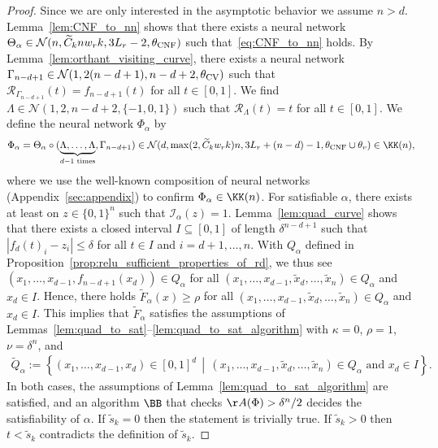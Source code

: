 \documentclass{amsart}[11pt]
\numberwithin{equation}{section}
\newcommand{\nn}{\mathcal{N}}
\newcommand{\realization}{\mathcal{R}}
\newcommand{\interpretation}{\mathcal{I}}
\numberwithin{theorem}{section}
\begin{document}
\begin{proof}
    Since we are only interested in the asymptotic behavior we assume $n > d$. Lemma~\ref{lem:CNF_to_nn} shows that there exists a neural network $\Theta_\alpha \in \nn(n, \widetilde C_k n w_r k, 3L_r - 2, \theta_{\rm{CNF}})$ such that~\eqref{eq:CNF_to_nn} holds. By Lemma~\ref{lem:orthant_visiting_curve}, there exists a neural network $\Gamma_{n - d + 1} \in \nn(1, 2(n - d + 1), n - d + 2, \theta_{\rm CV})$ such that $\realization_{\Gamma_{n - d + 1}}(t) = f_{n - d + 1}(t)$ for all $t \in [0, 1]$. We find $\Lambda \in \nn(1, 2, n - d + 2, \{-1, 0, 1\})$ such that $\realization_{\Lambda}(t) = t$ for all $t \in [0, 1]$. We define the neural network $\Phi_\alpha$ by
    \begin{align*}
        \Phi_\alpha = \Theta_\alpha \circ (\underbrace{\Lambda, \ldots, \Lambda}_{d-1 \text{ times}}, \Gamma_{n - d + 1}) \in \nn(d, \max(2, \widetilde C_k w_r k)n, 3L_r + (n - d) - 1, \theta_{\rm{CNF}} \cup \theta_{v}) \in \KK(n),
    \end{align*}
    where we use the well-known composition of neural networks (Appendix~\ref{sec:appendix}) to confirm $\Phi_\alpha \in \KK(n)$. 
    For satisfiable $\alpha$, there exists at least on $z\in \{0,1\}^n$ such that $\interpretation_\alpha(z)=1$.
    Lemma~\ref{lem:quad_curve} shows that there exists a closed interval $I \subseteq [0, 1]$ of length $\delta^{n-d+1}$ such that $|f_d(t)_i- z_i| \leq \delta$ for all $t \in I$ and $i= d +1,\ldots,n$. 
    With $Q_\alpha$ defined in Proposition~\ref{prop:relu_sufficient_properties_of_rd}, we thus see $(x_1,\ldots,x_{d-1},f_{n-d+1}(x_d))\in Q_\alpha$ for all $(x_1,\ldots,x_{d-1}, \widetilde x_d, \ldots, \widetilde x_n)\in Q_\alpha$ and $x_d\in I$.
    Hence, there holds $\widetilde F_\alpha(x)\geq \rho$ for all $(x_1,\ldots,x_{d-1}, \widetilde x_d, \ldots, \widetilde x_n)\in Q_\alpha$ and $x_d\in I$.
    This implies that $\widetilde F_\alpha$ satisfies the assumptions of Lemmas~\ref{lem:quad_to_sat}--\ref{lem:quad_to_sat_algorithm} with $\kappa=0$, $\rho=1$, $\nu = \delta^n$, and
    \begin{align*}
        \widetilde{Q}_\alpha := \left\{(x_1,\ldots,x_{d-1},x_d) \in [0, 1]^d \, \middle| \, (x_1,\ldots,x_{d-1},\widetilde x_d, \ldots, \widetilde x_n) \in Q_\alpha\text{ and } x_d\in I\right\}.
    \end{align*}
    In both cases, the assumptions of Lemma~\ref{lem:quad_to_sat_algorithm} are satisfied, and an algorithm $\BB$ that checks $\AA(\Phi) > \delta^{n}/2$ decides the satisfiability of $\alpha$. If $\widetilde s_k = 0$ then the statement is trivially true. If $\widetilde s_k > 0$ then $t < \widetilde s_k$ contradicts the definition of $\widetilde s_k$.



\end{proof}
\end{document}
